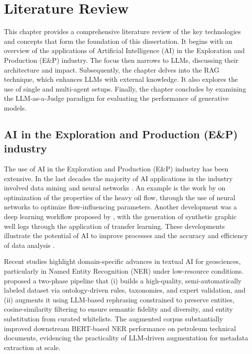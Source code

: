     
\chapter{Literature Review} 

    This chapter provides a comprehensive literature review of the key technologies and concepts that form the foundation of this dissertation. It begins with an overview of the applications of Artificial Intelligence (AI) in the Exploration and Production (E\&P) industry. The focus then narrows to LLMs, discussing their architecture and impact. Subsequently, the chapter delves into the RAG technique, which enhances LLMs with external knowledge. It also explores the use of single and multi-agent setups. Finally, the chapter concludes by examining the LLM-as-a-Judge paradigm for evaluating the performance of generative models.

    \section{AI in the Exploration and Production (E\&P) industry}

        The use of AI in the Exploration and Production (E\&P) industry has been extensive. 
        In the last decades the majority of AI applications in the industry involved data mining and neural networks \citep{Bravo2014}. 
        An example is the work by \citep{Gudala2021} on optimization of the properties of the heavy oil flow, through the use of neural networks to optimize flow-influencing parameters.
        Another development was a deep learning workflow proposed by \citep{Gohari2024}, with the generation of synthetic graphic well logs through the application of transfer learning. 
        These developments illustrate the potential of AI to improve processes and the accuracy and efficiency of data analysis \citep{Rahmani2021}.

        Recent studies highlight domain-specific advances in textual AI for geosciences, particularly in Named Entity Recognition (NER) under low-resource conditions. \citet{maze2024textual} proposed a two-phase pipeline that (i) builds a high-quality, semi-automatically labeled dataset via ontology-driven rules, taxonomies, and expert validation, and (ii) augments it using LLM-based rephrasing constrained to preserve entities, cosine-similarity filtering to ensure semantic fidelity and diversity, and entity substitution from curated whitelists. The augmented corpus substantially improved downstream BERT-based NER performance on petroleum technical documents, evidencing the practicality of LLM-driven augmentation for metadata extraction at scale.
    
